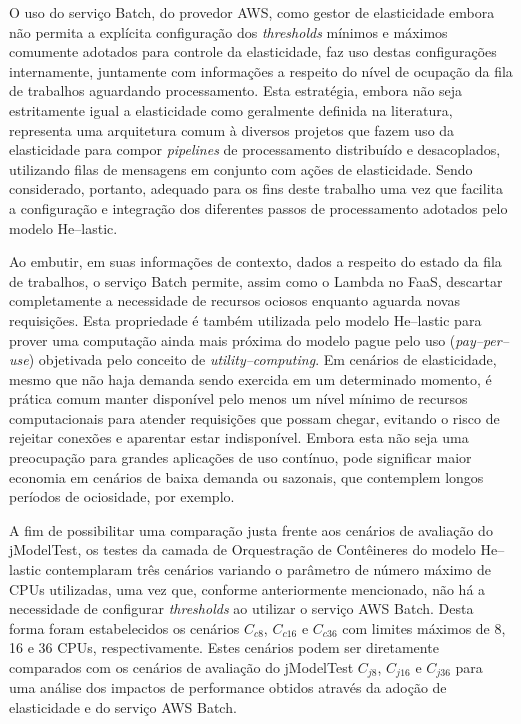 \documentclass[english,brazilian]{UNISINOSmonografia} %
\begin{document}
O uso do serviço Batch, do provedor AWS, como gestor de elasticidade embora não permita a explícita configuração dos \textit{thresholds} mínimos e máximos comumente adotados para controle da elasticidade, faz uso destas configurações internamente, juntamente com informações a respeito do nível de ocupação da fila de trabalhos aguardando processamento.
%
Esta estratégia, embora não seja estritamente igual a elasticidade como geralmente definida na literatura, representa uma arquitetura comum à diversos projetos que fazem uso da elasticidade para compor \textit{pipelines} de processamento distribuído e desacoplados, utilizando filas de mensagens em conjunto com ações de elasticidade.
%
Sendo considerado, portanto, adequado para os fins deste trabalho uma vez que facilita a configuração e integração dos diferentes passos de processamento adotados pelo modelo \textsf{He}--lastic.


Ao embutir, em suas informações de contexto, dados a respeito do estado da fila de trabalhos, o serviço Batch permite, assim como o Lambda no FaaS, descartar completamente a necessidade de recursos ociosos enquanto aguarda novas requisições.
%
Esta propriedade é também utilizada pelo modelo \textsf{He}--lastic para prover uma computação ainda mais próxima do modelo pague pelo uso (\textit{pay--per--use}) objetivada pelo conceito de \textit{utility--computing}.
%
Em cenários de elasticidade, mesmo que não haja demanda sendo exercida em um determinado momento, é prática comum manter disponível pelo menos um nível mínimo de recursos computacionais para atender requisições que possam chegar, evitando o risco de rejeitar conexões e aparentar estar indisponível.
%
Embora esta não seja uma preocupação para grandes aplicações de uso contínuo, pode significar maior economia em cenários de baixa demanda ou sazonais, que contemplem longos períodos de ociosidade, por exemplo.


A fim de possibilitar uma comparação justa frente aos cenários de avaliação do jModelTest, os testes da camada de Orquestração de Contêineres do modelo \textsf{He}--lastic contemplaram três cenários variando o parâmetro de número máximo de CPUs utilizadas, uma vez que, conforme anteriormente mencionado, não há a necessidade de configurar \textit{thresholds} ao utilizar o serviço AWS Batch.
%
Desta forma foram estabelecidos os cenários $C_{c8}$, $C_{c16}$ e $C_{c36}$ com limites máximos de 8, 16 e 36 CPUs, respectivamente.
%
Estes cenários podem ser diretamente comparados com os cenários de avaliação do jModelTest $C_{j8}$, $C_{j16}$ e $C_{j36}$ para uma análise dos impactos de performance obtidos através da adoção de elasticidade e do serviço AWS Batch.
\end{document}
